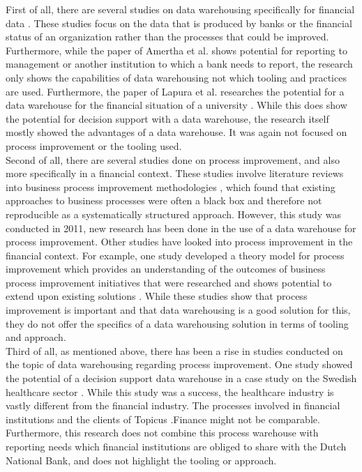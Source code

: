 \documentclass[11pt]{article}
\begin{document}
First of all, there are several studies on data warehousing specifically for financial data \cite{amertha2020data, lapura2018development}. These studies focus on the data that is produced by banks or the financial status of an organization rather than the processes that could be improved. Furthermore, while the paper of Amertha et al. \cite{amertha2020data} shows potential for reporting to management or another institution to which a bank needs to report, the research only shows the capabilities of data warehousing not which tooling and practices are used. Furthermore, the paper of Lapura et al. researches the potential for a data warehouse for the financial situation of a university \cite{lapura2018development}. While this does show the potential for decision support with a data warehouse, the research itself mostly showed the advantages of a data warehouse. It was again not focused on process improvement or the tooling used. \\

Second of all, there are several studies done on process improvement, and also more specifically in a financial context. These studies involve literature reviews into business process improvement methodologies \cite{zellner2011structured}, which found that existing approaches to business processes were often a black box and therefore not reproducible as a systematically structured approach. However, this study was conducted in 2011, new research has been done in the use of a data warehouse for process improvement. Other studies have looked into process improvement in the financial context. For example, one study developed a theory model for process improvement which provides an understanding of the outcomes of business process improvement initiatives that were researched and shows potential to extend upon existing solutions \cite{buavaraporn2013business}. While these studies show that process improvement is important and that data warehousing is a good solution for this, they do not offer the specifics of a data warehousing solution in terms of tooling and approach. \\

Third of all, as mentioned above, there has been a rise in studies conducted on the topic of data warehousing regarding process improvement. One study showed the potential of a decision support data warehouse in a case study on the Swedish healthcare sector \cite{shahzad2009goal}. While this study was a success, the healthcare industry is vastly different from the financial industry. The processes involved in financial institutions and the clients of Topicus .Finance might not be comparable. Furthermore, this research does not combine this process warehouse with reporting needs which financial institutions are obliged to share with the Dutch National Bank, and does not highlight the tooling or approach.\\
\end{document}
